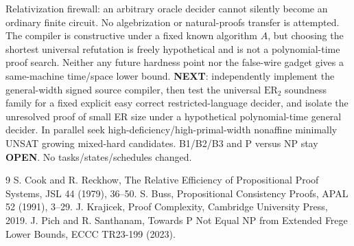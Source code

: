 \documentclass[11pt]{article}
\begin{document}
Relativization firewall: an arbitrary oracle decider cannot silently become an ordinary finite circuit. No algebrization or natural-proofs transfer is attempted. The compiler is constructive under a fixed known algorithm \(A\), but choosing the shortest universal refutation is freely hypothetical and is not a polynomial-time proof search. Neither any future hardness point nor the false-wire gadget gives a same-machine time/space lower bound. \textbf{NEXT}: independently implement the general-width signed source compiler, then test the universal \(\mathrm{ER}_2\) soundness family for a fixed explicit easy correct restricted-language decider, and isolate the unresolved proof of small ER size under a hypothetical polynomial-time general decider. In parallel seek high-deficiency/high-primal-width nonaffine minimally UNSAT growing mixed-hard candidates. B1/B2/B3 and P versus NP stay \textbf{OPEN}. No tasks/states/schedules changed.

\begin{thebibliography}{9}
 S. Cook and R. Reckhow, The Relative Efficiency of Propositional Proof Systems, JSL 44 (1979), 36--50.
 S. Buss, Propositional Consistency Proofs, APAL 52 (1991), 3--29.
 J. Krajicek, Proof Complexity, Cambridge University Press, 2019.
 J. Pich and R. Santhanam, Towards P Not Equal NP from Extended Frege Lower Bounds, ECCC TR23-199 (2023).
\end{thebibliography}
\end{document}
